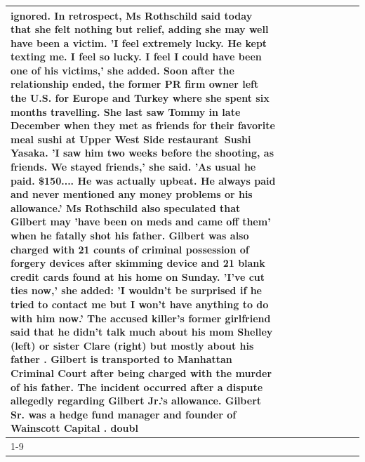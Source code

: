 \begin{table}[H]
\begin{tabular}{lllrlllll}
ignored. In retrospect, Ms Rothschild said today that she felt nothing but relief, adding she may well have been a victim. 'I feel extremely lucky. He kept texting me. I feel so lucky. I feel I could have been one of his victims,' she added. Soon after the relationship ended, the former PR firm owner left the U.S. for Europe and Turkey where she spent six months  travelling. She last saw Tommy in late December when they met as friends for their favorite meal sushi at Upper West Side restaurant Sushi Yasaka. 'I saw him two weeks before the shooting, as friends. We stayed friends,' she said. 'As usual he paid. \$150.... He was actually upbeat. He always paid and never mentioned any money problems or his allowance.' Ms Rothschild also speculated that Gilbert may 'have been on meds and came off them' when he fatally shot his father. Gilbert was also charged with 21 counts of criminal possession of forgery devices after skimming device and 21 blank credit cards found at his home on Sunday. 'I've cut ties now,' she added: 'I wouldn’t be surprised if he tried to contact me but I won’t have anything to do with him now.' The accused killer's former girlfriend said that he didn't talk much about his mom Shelley (left) or sister Clare (right) but mostly about his father . Gilbert is transported to Manhattan Criminal Court  after being charged with the murder of his father. The incident occurred after a dispute allegedly regarding Gilbert Jr.'s allowance. Gilbert Sr. was a hedge fund manager and founder of Wainscott Capital . doubl \\
\cline{1-9} \cline{2-9}

\end{tabular}
\end{table}
